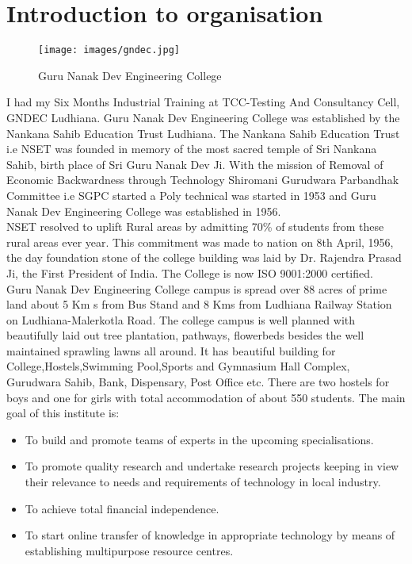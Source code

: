 \section{Introduction to organisation}
\begin{figure}[ht]
\centering
\texttt{[image: images/gndec.jpg]}
\caption{Guru Nanak Dev Engineering College}
\end{figure}
\hspace{-1.7em} I had my Six Months Industrial Training at TCC-Testing And Consultancy Cell, GNDEC Ludhiana. Guru Nanak Dev Engineering College was established by the Nankana
Sahib Education Trust Ludhiana. The Nankana Sahib Education Trust i.e NSET
was founded in memory of the most sacred temple of Sri Nankana Sahib, birth place
of Sri Guru Nanak Dev Ji. With the mission of Removal of Economic Backwardness
through Technology Shiromani Gurudwara Parbandhak Committee i.e SGPC started a
Poly technical was started in 1953 and Guru Nanak Dev Engineering College was established in 1956.\\

NSET resolved to uplift Rural areas by admitting 70\% 
of students from these rural
areas ever year. This commitment was made to nation on 8th April, 1956, the day
foundation stone of the college building was laid by Dr. Rajendra Prasad Ji, the First
President of India. The College is now ISO 9001:2000 certified.\\

Guru Nanak Dev Engineering College campus is spread over 88 acres of prime land
about 5 Km s from Bus Stand and 8 Kms from Ludhiana Railway Station on Ludhiana-Malerkotla Road. The college campus is well planned with beautifully laid out tree plantation, pathways, flowerbeds besides the well maintained sprawling lawns all around. It
has beautiful building for College,Hostels,Swimming Pool,Sports and Gymnasium Hall
Complex, Gurudwara Sahib, Bank, Dispensary, Post Office etc. There are two hostels
for boys and one for girls with total accommodation of about 550 students. The main
goal of this institute is:\\
\begin{itemize}
\item To build and promote teams of experts in the upcoming specialisations.
\item To promote quality research and undertake research projects keeping in view their
relevance to needs and requirements of technology in local industry.
\item To achieve total financial independence.
\item To start online transfer of knowledge in appropriate technology by means of establishing multipurpose resource centres.
\end{itemize}
